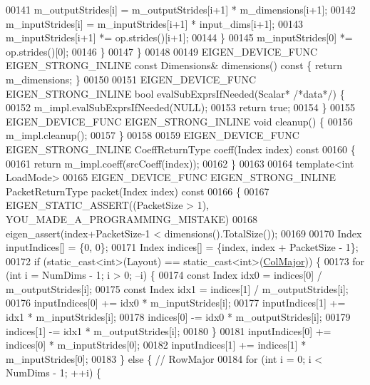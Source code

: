 \begin{DoxyCode}
00141         m\_outputStrides[i] = m\_outputStrides[i+1] * m\_dimensions[i+1];
00142         m\_inputStrides[i] = m\_inputStrides[i+1] * input\_dims[i+1];
00143         m\_inputStrides[i+1] *= op.strides()[i+1];
00144       \}
00145       m\_inputStrides[0] *= op.strides()[0];
00146     \}
00147   \}
00148 
00149   EIGEN\_DEVICE\_FUNC EIGEN\_STRONG\_INLINE \textcolor{keyword}{const} Dimensions& dimensions()\textcolor{keyword}{ const }\{ \textcolor{keywordflow}{return} m\_dimensions; \}
00150 
00151   EIGEN\_DEVICE\_FUNC EIGEN\_STRONG\_INLINE \textcolor{keywordtype}{bool} evalSubExprsIfNeeded(Scalar* \textcolor{comment}{/*data*/}) \{
00152     m\_impl.evalSubExprsIfNeeded(NULL);
00153     \textcolor{keywordflow}{return} \textcolor{keyword}{true};
00154   \}
00155   EIGEN\_DEVICE\_FUNC EIGEN\_STRONG\_INLINE \textcolor{keywordtype}{void} cleanup() \{
00156     m\_impl.cleanup();
00157   \}
00158 
00159   EIGEN\_DEVICE\_FUNC EIGEN\_STRONG\_INLINE CoeffReturnType coeff(Index index)\textcolor{keyword}{ const}
00160 \textcolor{keyword}{  }\{
00161     \textcolor{keywordflow}{return} m\_impl.coeff(srcCoeff(index));
00162   \}
00163 
00164   \textcolor{keyword}{template}<\textcolor{keywordtype}{int} LoadMode>
00165   EIGEN\_DEVICE\_FUNC EIGEN\_STRONG\_INLINE PacketReturnType packet(Index index)\textcolor{keyword}{ const}
00166 \textcolor{keyword}{  }\{
00167     EIGEN\_STATIC\_ASSERT((PacketSize > 1), YOU\_MADE\_A\_PROGRAMMING\_MISTAKE)
00168     eigen\_assert(index+PacketSize-1 < dimensions().TotalSize());
00169 
00170     Index inputIndices[] = \{0, 0\};
00171     Index indices[] = \{index, index + PacketSize - 1\};
00172     \textcolor{keywordflow}{if} (static\_cast<int>(Layout) == static\_cast<int>(\hyperlink{group__enums_ggaacded1a18ae58b0f554751f6cdf9eb13a0cbd4bdd0abcfc0224c5fcb5e4f6669a}{ColMajor})) \{
00173       \textcolor{keywordflow}{for} (\textcolor{keywordtype}{int} i = NumDims - 1; i > 0; --i) \{
00174         \textcolor{keyword}{const} Index idx0 = indices[0] / m\_outputStrides[i];
00175         \textcolor{keyword}{const} Index idx1 = indices[1] / m\_outputStrides[i];
00176         inputIndices[0] += idx0 * m\_inputStrides[i];
00177         inputIndices[1] += idx1 * m\_inputStrides[i];
00178         indices[0] -= idx0 * m\_outputStrides[i];
00179         indices[1] -= idx1 * m\_outputStrides[i];
00180       \}
00181       inputIndices[0] += indices[0] * m\_inputStrides[0];
00182       inputIndices[1] += indices[1] * m\_inputStrides[0];
00183     \} \textcolor{keywordflow}{else} \{  \textcolor{comment}{// RowMajor}
00184       \textcolor{keywordflow}{for} (\textcolor{keywordtype}{int} i = 0; i < NumDims - 1; ++i) \{

\end{DoxyCode}
